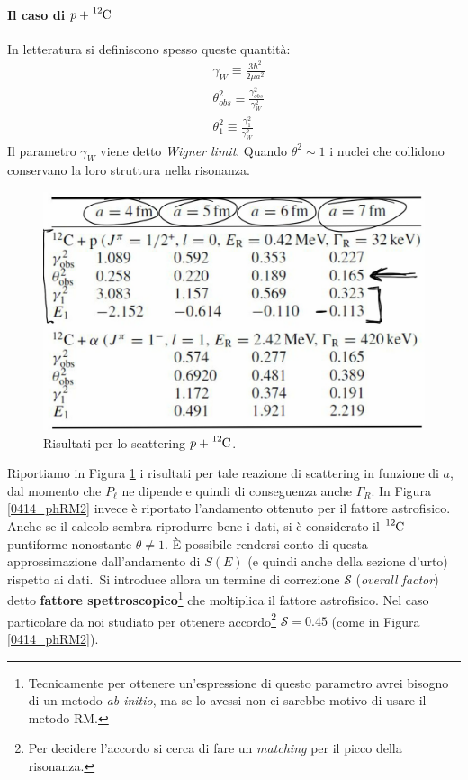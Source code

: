 \paragraph{Il caso di $p + \ce{^{12}C}$}
In letteratura si definiscono spesso queste quantità:
\begin{align*}
	&\gamma_W \equiv \frac{3\hbar^2}{2\mu a^2} \\
	&\theta_{obs}^2 \equiv \frac{\gamma^2_{obs}}{\gamma_W^2} \\
	&\theta_{1}^2 \equiv \frac{\gamma^2_{1}}{\gamma_W^2}
\end{align*}
Il parametro $\gamma_W$ viene detto \textit{Wigner limit}. Quando $\theta^2\sim 1$ i nuclei che collidono conservano la loro struttura nella risonanza.
\begin{figure}[!h]
	\centering
	\includegraphics[scale=0.3]{Immagini/0414_RM.png}
	\caption{Risultati per lo scattering $p + \ce{^{12}C}$.}
	\label{0414_phRM1}
\end{figure}
\noindent Riportiamo in Figura \ref{0414_phRM1} i risultati per tale reazione di scattering in funzione di $a$, dal momento che $P_\ell$ ne dipende e quindi di conseguenza anche $\Gamma_R$. In Figura \ref{0414_phRM2} invece è riportato l'andamento ottenuto per il fattore astrofisico. Anche se il calcolo sembra riprodurre bene i dati, si è considerato il $\ce{^{12}C}$ puntiforme nonostante $\theta\not = 1$. È possibile rendersi conto di questa approssimazione dall'andamento di $S(E)$ (e quindi anche della sezione d'urto) rispetto ai dati.\ Si introduce allora un termine di correzione $\mathcal{S}$ (\textit{overall factor}) detto \textbf{fattore spettroscopico}\footnote{Tecnicamente per ottenere un'espressione di questo parametro avrei bisogno di un metodo \textit{ab-initio}, ma se lo avessi non ci sarebbe motivo di usare il metodo RM.} che moltiplica il fattore astrofisico. Nel caso particolare da noi studiato per ottenere accordo\footnote{Per decidere l'accordo si cerca di fare un \textit{matching} per il picco della risonanza.} $\mathcal{S} = 0.45$ (come in Figura \ref{0414_phRM2}).
